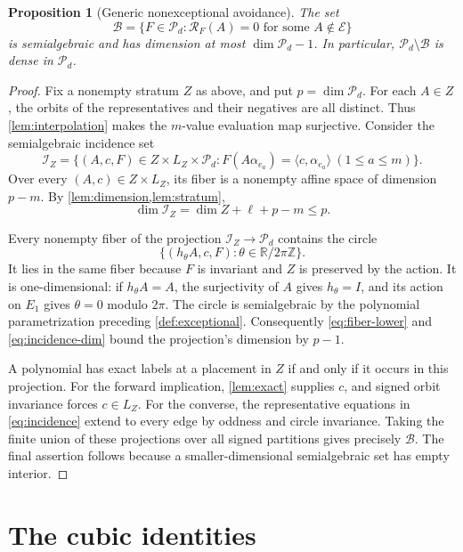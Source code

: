 \documentclass[11pt,reqno]{amsart}
\newtheorem{proposition}[proposition]{Proposition}
\theoremstyle{definition}
\theoremstyle{remark}
\numberwithin{equation}{section}
\newcommand{\R}{\mathbb R}
\newcommand{\Pol}{\mathcal P_d}
\newcommand{\Exc}{\mathcal E}
\newcommand{\ip}[2]{\langle #1,#2\rangle}
\begin{document}
\begin{proposition}[Generic nonexceptional avoidance]\label{prop:generic}
The set
\[
 \mathcal B=\{F\in\Pol:\mathcal R_F(A)=0
                      \text{ for some }A\notin\Exc\}
\]
is semialgebraic and has dimension at most $\dim\Pol-1$.
In particular, $\Pol\setminus\mathcal B$ is dense in $\Pol$.
\end{proposition}
\begin{proof}
Fix a nonempty stratum $Z$ as above, and put $p=\dim\Pol$.
For each $A\in Z$, the orbits of the representatives and their
negatives are all distinct. Thus \cref{lem:interpolation} makes
the $m$-value evaluation map surjective. Consider the semialgebraic
incidence set
\begin{equation}\label{eq:incidence}
 \mathcal I_Z=\{(A,c,F)\in Z\times L_Z\times\Pol:
 F(A\alpha_{e_a})=\ip{c}{\alpha_{e_a}}
                         \ (1\leq a\leq m)\}.
\end{equation}
Over every $(A,c)\in Z\times L_Z$, its fiber is a nonempty affine
space of dimension $p-m$. By \cref{lem:dimension,lem:stratum},
\begin{equation}\label{eq:incidence-dim}
 \dim\mathcal I_Z=\dim Z+\ell+p-m\leq p.
\end{equation}

Every nonempty fiber of the projection $\mathcal I_Z\to\Pol$
contains the circle
\[
 \{(h_\theta A,c,F):\theta\in\R/2\pi\mathbb Z\}.
\]
It lies in the same fiber because $F$ is invariant and $Z$ is
preserved by the action. It is one-dimensional: if
$h_\theta A=A$, the surjectivity of $A$ gives $h_\theta=I$, and
its action on $E_1$ gives $\theta=0$ modulo $2\pi$.
The circle is semialgebraic by the polynomial parametrization
preceding \cref{def:exceptional}. Consequently
\eqref{eq:fiber-lower} and \eqref{eq:incidence-dim} bound the
projection's dimension by $p-1$.

A polynomial has exact labels at a placement in $Z$ if and only
if it occurs in this projection. For the forward implication,
\cref{lem:exact} supplies $c$, and signed orbit invariance forces
$c\in L_Z$. For the converse, the representative equations in
\eqref{eq:incidence} extend to every edge by oddness and circle
invariance. Taking the finite union of these projections over
all signed partitions gives precisely $\mathcal B$. The final
assertion follows because a smaller-dimensional semialgebraic
set has empty interior.
\end{proof}

\section{The cubic identities}\label{sec:cubic}
\end{document}
